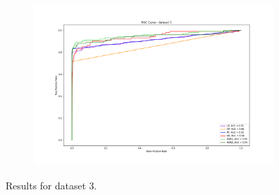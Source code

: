 \documentclass{Configuration_Files/PoliMi3i_thesis}
\begin{document}
\begin{figure}[H]
\begin{subfigure}
    \centering
    \includegraphics[scale=0.3]{Images/ROC_3.png}
\end{subfigure}
  \caption{Results for dataset 3.}
\end{figure}
\end{document}
